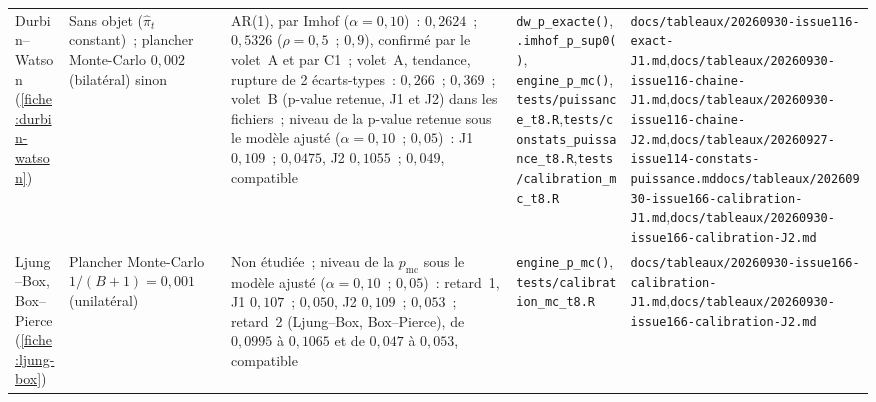 \documentclass[a4paper,11pt]{article}
\newcommand{\code}[1]{\texttt{\small #1}}
\begin{document}
\begin{landscape}
\begin{center}
\begin{longtable}{@{}>{\raggedright\arraybackslash}p{2.5cm}>{\raggedright\arraybackslash}p{3.6cm}>{\raggedright\arraybackslash}p{4.0cm}>{\raggedright\arraybackslash}p{6.7cm}>{\raggedright\arraybackslash}p{7.2cm}@{}}
Durbin--Watson (\ref{fiche:durbin-watson}) & Sans objet ($\hat\pi_t$ constant)~; plancher Monte-Carlo $0{,}002$ (bilatéral) sinon & AR(1), par Imhof ($\alpha = 0{,}10$)~: $0{,}2624$~; $0{,}5326$ ($\rho = 0{,}5$~; $0{,}9$), confirmé par le volet~A et par C1~; volet~A, tendance, rupture de 2 écarts-types~: $0{,}266$~; $0{,}369$~; volet~B (p-value retenue, J1 et J2) dans les fichiers~; niveau de la p-value retenue sous le modèle ajusté ($\alpha = 0{,}10$~; $0{,}05$)~: J1 $0{,}109$~; $0{,}0475$, J2 $0{,}1055$~; $0{,}049$, compatible & \code{dw\_p\_exacte()}, \code{.imhof\_p\_sup0()}, \code{engine\_p\_mc()},\newline \code{tests/puissance\_t8.R},\newline \code{tests/constats\_puissance\_t8.R},\newline \code{tests/calibration\_mc\_t8.R} & \code{docs/tableaux/}\newline \code{20260930-issue116-exact-J1.md},\newline \code{docs/tableaux/}\newline \code{20260930-issue116-chaine-J1.md},\newline \code{docs/tableaux/}\newline \code{20260930-issue116-chaine-J2.md},\newline \code{docs/tableaux/}\newline \code{20260927-issue114-constats-puissance.md}\newline \code{docs/tableaux/}\newline \code{20260930-issue166-calibration-J1.md},\newline \code{docs/tableaux/}\newline \code{20260930-issue166-calibration-J2.md} \\
Ljung--Box, Box--Pierce (\ref{fiche:ljung-box}) & Plancher Monte-Carlo $1/(B+1) = 0{,}001$ (unilatéral) & Non étudiée~; niveau de la $p_{\mathrm{mc}}$ sous le modèle ajusté ($\alpha = 0{,}10$~; $0{,}05$)~: retard~1, J1 $0{,}107$~; $0{,}050$, J2 $0{,}109$~; $0{,}053$~; retard~2 (Ljung--Box, Box--Pierce), de $0{,}0995$ à $0{,}1065$ et de $0{,}047$ à $0{,}053$, compatible & \code{engine\_p\_mc()},\newline \code{tests/calibration\_mc\_t8.R} & \code{docs/tableaux/}\newline \code{20260930-issue166-calibration-J1.md},\newline \code{docs/tableaux/}\newline \code{20260930-issue166-calibration-J2.md} \\

\end{longtable}
\end{center}
\end{landscape}
\end{document}
